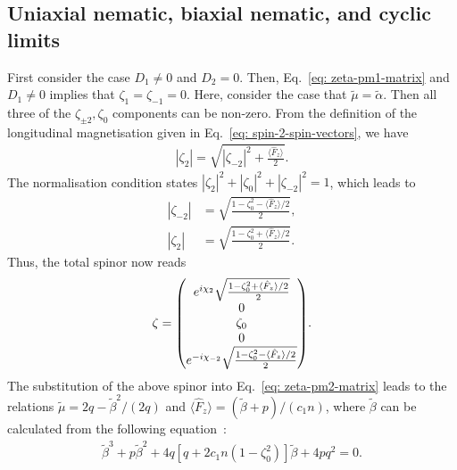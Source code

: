 \subsection{Uniaxial nematic, biaxial nematic, and cyclic limits}
First consider the case \(D_1 \neq 0\) and \(D_2 = 0\).
Then, Eq.~\eqref{eq: zeta-pm1-matrix} and \(D_1 \neq 0\) implies that
\(\zeta_1=\zeta_{-1}=0\).
Here, consider the case that \(\tilde{\mu} = \tilde{\alpha}\).
Then all three of the \(\zeta_{\pm 2}, \zeta_0\) components can be non-zero.
From the definition of the longitudinal magnetisation given in
Eq.~\eqref{eq: spin-2-spin-vectors}, we have
\begin{align}
    |\zeta_2| = \sqrt{|\zeta_{-2}|^2 + \frac{\langle\hat{F}_z\rangle}{2}}.
\end{align}
The normalisation condition states \(|\zeta_2|^2 + |\zeta_0|^2 +
|\zeta_{-2}|^2=1\), which leads to
\begin{align}
    |\zeta_{-2}| &= \sqrt{\frac{1 - \zeta_0^2 -\langle\hat{F}_z\rangle/2}{2}},\\
    |\zeta_2| &= \sqrt{\frac{1 - \zeta_0^2 + \langle\hat{F}_z\rangle/2}{2}}.
\end{align}
Thus, the total spinor now reads
\begin{align}\label{eq: intermediate-UN-BN}
    \zeta = \mqty(
        e^{i\chi_2}\sqrt{\frac{1 - \zeta_0^2 + \langle\hat{F}_z\rangle/2}{2}} \\
        0 \\
        \zeta_0 \\
        0 \\
        e^{-i\chi_{-2}}\sqrt{\frac{1 -\zeta_0^2 - \langle\hat{F}_z\rangle/2}{2}}
    ).
\end{align}
The substitution of the above spinor into Eq.~\eqref{eq: zeta-pm2-matrix} leads
to the relations \(\tilde{\mu} = 2q-\tilde{\beta}^2/(2q)\) and
\(\langle\hat{F}_z\rangle = (\tilde{\beta} + p)/(c_1n)\), where
\(\tilde{\beta}\) can be calculated from the following
equation~\cite{Kawaguchi2012}:
\begin{align}
    \tilde{\beta}^3 +p\tilde{\beta}^2 + 4q[q + 2c_1n(1-\zeta_0^2)]\tilde{\beta}
    + 4pq^2 = 0.
\end{align}

